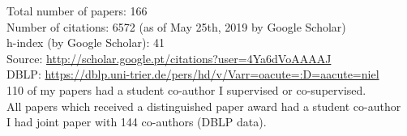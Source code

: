 \documentclass{xetexCV}
\begin{document}
Total number of papers: 166 \\
Number of citations: 6572 (as of May 25th, 2019 by Google Scholar) \\
h-index (by Google Scholar): 41 \\
Source: \url{http://scholar.google.pt/citations?user=4Ya6dVoAAAAJ}  \\
DBLP: \url{https://dblp.uni-trier.de/pers/hd/v/Varr=oacute=:D=aacute=niel}  \\

110 of my papers had a student co-author I supervised or co-supervised. \\
All papers which received a distinguished paper award had a student co-author \\
I had joint paper with 144 co-authors (DBLP data). \\

\end{document}
